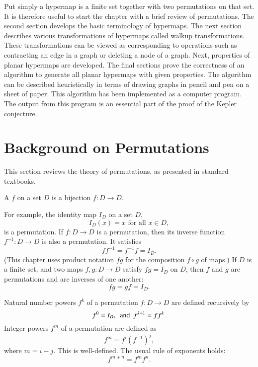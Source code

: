 \begin{summary}
Put simply a hypermap  is a finite set together
with two permutations on that set.  It is therefore useful to start
the chapter with a brief review of permutations.  The second section
develops the basic terminology of hypermaps.  The next section
describes various transformations of hypermaps called walkup
transformations.  These transformations can be viewed as corresponding
to  operations such as contracting an edge in a graph or deleting
a node of a graph.  Next, properties of planar hypermaps are
developed.  The final sections prove the correctness of an algorithm
to generate all planar hypermaps with given properties.  The algorithm
can be described heuristically in terms of drawing graphs in pencil
and pen on a sheet of paper.  This algorithm has been implemented as a
computer program.  The output from this program is an essential part
of the proof of the Kepler conjecture.
\end{summary}


\section{Background on Permutations}

This section reviews the theory of permutations, as presented in
standard textbooks.

\begin{definition}[permutation]
A  $f$ on a set
  $D$ is a bijection $f:D\to D$.
\end{definition}

For example, the identity map $I_D$ on a set $D$,
\[ 
I_D(x)=x \text{ for all } x \in D,
\] 
 is a permutation.
If $f:D\to D$ is a permutation, then  its inverse function $f^{-1}:D\to D$
is also a permutation.  
It satisfies
\[ 
f f^{-1} = f^{-1} f = I_D.
\] 
(This chapter uses product notation $f g$ for the composition $f\circ g$ of maps.)
If $D$ is a finite set, and two maps
$f,g:D\to D$ satisfy $f g = I_D$ on $D$, then $f$ and $g$ are permutations and are
inverses of one another:
\[ 
f g = g f = I_D.
\] 

Natural number powers  $f^k$ of a permutation $f:D\to D$ are defined
recursively by
\[ 
f^0 = I_D,\text{ \ and \ }  f^{k+1} = f f^k.
\] 
Integer powers $f^m$ of a permutation are defined as
\[f^m = f^i (f^{-1})^j,\] where $m = i -j$.  This is well-defined.
The usual rule of exponents holds:
\[ 
f^{m+n} = f^m f^n.
\] 


